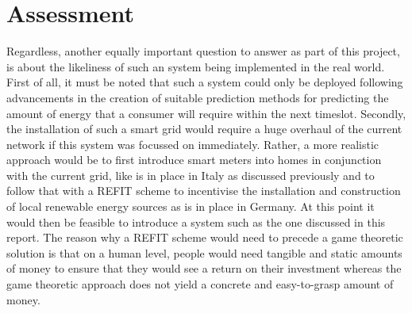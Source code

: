 \documentclass[a4paper, notitlepage]{report}
\begin{document}
\chapter{Assessment}
\label{sec:orga93310c}
Regardless, another equally important question to answer as part of this
project, is about the likeliness of such an system being implemented in the real
world. First of all, it must be noted that such a system could only be deployed
following advancements in the creation of suitable prediction methods for
predicting the amount of energy that a consumer will require within the next
timeslot. Secondly, the installation of such a smart grid would require a huge
overhaul of the current network if this system was focussed on immediately.
Rather, a more realistic approach would be to first introduce smart meters into
homes in conjunction with the current grid, like is in place in Italy as
discussed previously and to follow that with a REFIT scheme to incentivise the
installation and construction of local renewable energy sources as is in place
in Germany. At this point it would then be feasible to introduce a system such
as the one discussed in this report. The reason why a REFIT scheme would need to
precede a game theoretic solution is that on a human level, people would need
tangible and static amounts of money to ensure that they would see a return on
their investment whereas the game theoretic approach does not yield a concrete
and easy-to-grasp amount of money.

\printbibliography
\appendix
\end{document}
